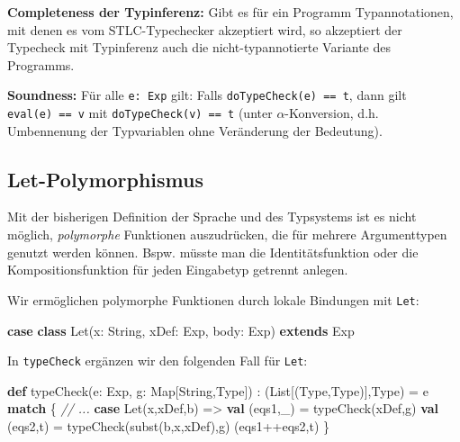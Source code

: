 \documentclass[]{article}
\newenvironment{Shaded}{}{}
\newcommand{\CommentTok}[1]{\textcolor[rgb]{0.38,0.63,0.69}{\textit{#1}}}
\newcommand{\FunctionTok}[1]{\textcolor[rgb]{0.02,0.16,0.49}{#1}}
\newcommand{\KeywordTok}[1]{\textcolor[rgb]{0.00,0.44,0.13}{\textbf{#1}}}
\newcommand{\NormalTok}[1]{#1}
\begin{document}
\textbf{Completeness der Typinferenz:} Gibt es für ein Programm
Typannotationen, mit denen es vom STLC-Typechecker akzeptiert wird, so
akzeptiert der Typecheck mit Typinferenz auch die nicht-typannotierte
Variante des Programms.

\textbf{Soundness:} Für alle \texttt{e:\ Exp} gilt: Falls
\texttt{doTypeCheck(e)\ ==\ t}, dann gilt \texttt{eval(e)\ ==\ v} mit
\texttt{doTypeCheck(v)\ ==\ t} (unter \(\alpha\)-Konversion, d.h.
Umbennenung der Typvariablen ohne Veränderung der Bedeutung).

\hypertarget{let-polymorphismus}{%
\subsection{Let-Polymorphismus}\label{let-polymorphismus}}

Mit der bisherigen Definition der Sprache und des Typsystems ist es
nicht möglich, \emph{polymorphe} Funktionen auszudrücken, die für
mehrere Argumenttypen genutzt werden können. Bspw. müsste man die
Identitätsfunktion oder die Kompositionsfunktion für jeden Eingabetyp
getrennt anlegen.

Wir ermöglichen polymorphe Funktionen durch lokale Bindungen mit
\texttt{Let}:

\begin{Shaded}
\begin{Highlighting}[]
\KeywordTok{case} \KeywordTok{class} \FunctionTok{Let}\NormalTok{(x: String, xDef: Exp, body: Exp) }\KeywordTok{extends}\NormalTok{ Exp}
\end{Highlighting}
\end{Shaded}

In \texttt{typeCheck} ergänzen wir den folgenden Fall für \texttt{Let}:

\begin{Shaded}
\begin{Highlighting}[]
\KeywordTok{def} \FunctionTok{typeCheck}\NormalTok{(e: Exp, g: Map[String,Type]) : (List[(Type,Type)],Type) = e }\KeywordTok{match}\NormalTok{ \{}
  \CommentTok{// ...}
  \KeywordTok{case} \FunctionTok{Let}\NormalTok{(x,xDef,b) =\textgreater{}}
    \KeywordTok{val}\NormalTok{ (eqs1,\_) = }\FunctionTok{typeCheck}\NormalTok{(xDef,g)}
    \KeywordTok{val}\NormalTok{ (eqs2,t) = }\FunctionTok{typeCheck}\NormalTok{(}\FunctionTok{subst}\NormalTok{(b,x,xDef),g)}
\NormalTok{    (eqs1++eqs2,t)}
\NormalTok{\}}
\end{Highlighting}
\end{Shaded}
\end{document}
